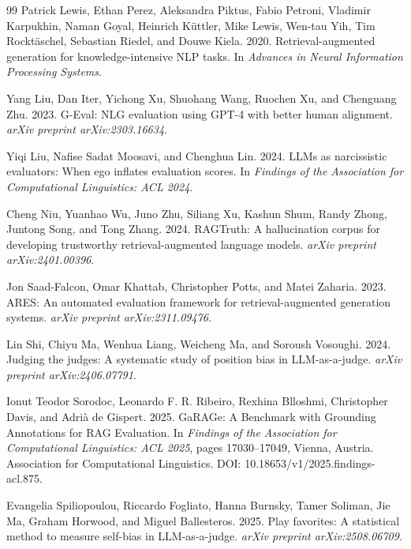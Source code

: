 \begin{thebibliography}{99}
Patrick Lewis, Ethan Perez, Aleksandra Piktus, Fabio Petroni, Vladimir Karpukhin, Naman Goyal, Heinrich K{\"u}ttler, Mike Lewis, Wen-tau Yih, Tim Rockt{\"a}schel, Sebastian Riedel, and Douwe Kiela. 2020.
\newblock Retrieval-augmented generation for knowledge-intensive NLP tasks.
\newblock In \emph{Advances in Neural Information Processing Systems}.

Yang Liu, Dan Iter, Yichong Xu, Shuohang Wang, Ruochen Xu, and Chenguang Zhu. 2023.
\newblock G-Eval: NLG evaluation using GPT-4 with better human alignment.
\newblock \emph{arXiv preprint arXiv:2303.16634}.

Yiqi Liu, Nafise Sadat Moosavi, and Chenghua Lin. 2024.
\newblock LLMs as narcissistic evaluators: When ego inflates evaluation scores.
\newblock In \emph{Findings of the Association for Computational Linguistics: ACL 2024}.

Cheng Niu, Yuanhao Wu, Juno Zhu, Siliang Xu, Kashun Shum, Randy Zhong, Juntong Song, and Tong Zhang. 2024.
\newblock RAGTruth: A hallucination corpus for developing trustworthy retrieval-augmented language models.
\newblock \emph{arXiv preprint arXiv:2401.00396}.

Jon Saad-Falcon, Omar Khattab, Christopher Potts, and Matei Zaharia. 2023.
\newblock ARES: An automated evaluation framework for retrieval-augmented generation systems.
\newblock \emph{arXiv preprint arXiv:2311.09476}.

Lin Shi, Chiyu Ma, Wenhua Liang, Weicheng Ma, and Soroush Vosoughi. 2024.
\newblock Judging the judges: A systematic study of position bias in LLM-as-a-judge.
\newblock \emph{arXiv preprint arXiv:2406.07791}.

Ionut Teodor Sorodoc, Leonardo F. R. Ribeiro, Rexhina Blloshmi, Christopher Davis, and Adri{\`a} de Gispert. 2025.
\newblock GaRAGe: A Benchmark with Grounding Annotations for RAG Evaluation.
\newblock In \emph{Findings of the Association for Computational Linguistics: ACL 2025}, pages 17030--17049, Vienna, Austria. Association for Computational Linguistics. DOI: 10.18653/v1/2025.findings-acl.875.

Evangelia Spiliopoulou, Riccardo Fogliato, Hanna Burnsky, Tamer Soliman, Jie Ma, Graham Horwood, and Miguel Ballesteros. 2025.
\newblock Play favorites: A statistical method to measure self-bias in LLM-as-a-judge.
\newblock \emph{arXiv preprint arXiv:2508.06709}.


\end{thebibliography}
